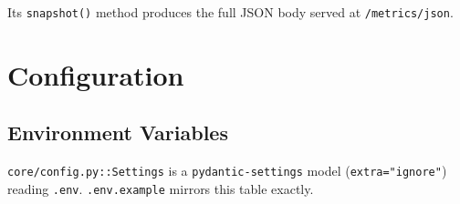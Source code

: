 \documentclass[11pt,a4paper]{report}
\newcommand{\code}[1]{\texttt{#1}}
\newcommand{\file}[1]{\texttt{\small #1}}
\begin{document}
Its \code{snapshot()} method produces the full JSON body served at
\code{/metrics/json}.

\chapter{Configuration}

\section{Environment Variables}

\code{core/config.py}\code{::Settings} is a \code{pydantic-settings} model
(\code{extra="ignore"}) reading \file{.env}. \file{.env.example} mirrors this table
exactly.
\end{document}
